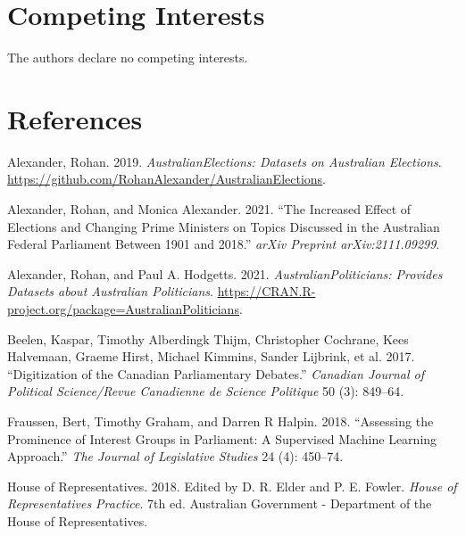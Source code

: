 \documentclass[
  letterpaper,
  DIV=11,
  numbers=noendperiod]{scrartcl}
\newlength{\cslhangindent}
\newlength{\cslentryspacingunit} %
\newenvironment{CSLReferences}[2] %
 {%
  \setlength{\parindent}{0pt}
  \ifodd #1
  \let\oldpar\par
  \def\par{\hangindent=\cslhangindent\oldpar}
  \fi
  \setlength{\parskip}{#2\cslentryspacingunit}
 }%
 {}
\begin{document}
\hypertarget{competing-interests}{%
\section{Competing Interests}\label{competing-interests}}

The authors declare no competing interests.

\hypertarget{references}{%
\section*{References}\label{references}}

\hypertarget{refs}{}
\begin{CSLReferences}{1}{0}
\leavevmode{}%
Alexander, Rohan. 2019. \emph{AustralianElections: Datasets on
Australian Elections}.
\url{https://github.com/RohanAlexander/AustralianElections}.

\leavevmode{}%
Alexander, Rohan, and Monica Alexander. 2021. {``The Increased Effect of
Elections and Changing Prime Ministers on Topics Discussed in the
Australian Federal Parliament Between 1901 and 2018.''} \emph{arXiv
Preprint arXiv:2111.09299}.

\leavevmode{}%
Alexander, Rohan, and Paul A. Hodgetts. 2021.
\emph{AustralianPoliticians: Provides Datasets about Australian
Politicians}.
\url{https://CRAN.R-project.org/package=AustralianPoliticians}.

\leavevmode{}%
Beelen, Kaspar, Timothy Alberdingk Thijm, Christopher Cochrane, Kees
Halvemaan, Graeme Hirst, Michael Kimmins, Sander Lijbrink, et al. 2017.
{``Digitization of the Canadian Parliamentary Debates.''} \emph{Canadian
Journal of Political Science/Revue Canadienne de Science Politique} 50
(3): 849--64.

\leavevmode{}%
Fraussen, Bert, Timothy Graham, and Darren R Halpin. 2018. {``Assessing
the Prominence of Interest Groups in Parliament: A Supervised Machine
Learning Approach.''} \emph{The Journal of Legislative Studies} 24 (4):
450--74.

\leavevmode{}%
House of Representatives. 2018. Edited by D. R. Elder and P. E. Fowler.
\emph{{House of Representatives Practice}}. 7th ed. {Australian
Government - Department of the House of Representatives}.


\end{CSLReferences}
\end{document}
